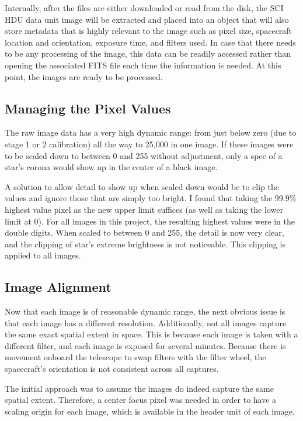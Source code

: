\documentclass[10pt,twocolumn,letterpaper]{article}
\begin{document}
Internally, after the files are either downloaded or read from the disk, the SCI HDU data unit image will be extracted and placed into an object that will also store metadata that is highly relevant to the image such as pixel size, spacecraft location and orientation, exposure time, and filters used. 
In case that there needs to be any processing of the image, this data can be readily accessed rather than opening the associated FITS file each time the information is needed. At this point, the images are ready to be processed.

\subsection{Managing the Pixel Values}
The raw image data has a very high dynamic range: from just below zero (due to stage 1 or 2 calibration) all the way to 25,000 in one image. If these images were to be scaled down to between 0 and 255 without adjustment, only a spec of a star's corona would show up in the center of a black image.

A solution to allow detail to show up when scaled down would be to clip the values and ignore those that are simply too bright. I found that taking the 99.9\% highest value pixel as the new upper limit suffices (as well as taking the lower limit at 0). 
For all images in this project, the resulting highest values were in the double digits. When scaled to between 0 and 255, the detail is now very clear, and the clipping of star's extreme brightness is not noticeable. This clipping is applied to all images.

\subsection{Image Alignment}

Now that each image is of reasonable dynamic range, the next obvious issue is that each image has a different resolution. Additionally, not all images capture the same exact spatial extent in space. This is because each image is taken with a different filter, and each image is exposed for several minutes. Because there is movement onboard the telescope to swap filters with the filter wheel, the spacecraft's orientation is not consistent across all captures.

The initial approach was to assume the images do indeed capture the same spatial extent. Therefore, a center focus pixel was needed in order to have a scaling origin for each image, which is available in the header unit of each image.
\end{document}
